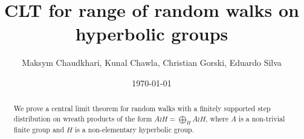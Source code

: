 \documentclass[reqno,oneside,11pt]{amsart}
\title{CLT for range of random walks on hyperbolic groups}
\author{Maksym Chaudkhari, Kunal Chawla, Christian Gorski, Eduardo Silva }
\date{\today}
\begin{document}
	\begin{abstract} 
We prove a central limit theorem for random walks with a finitely supported step distribution on wreath products of the form $A\wr H=\bigoplus_H A\wr H $, where $A$ is a non-trivial finite group and $H$ is a non-elementary hyperbolic group.
	\end{abstract}
\maketitle



%
%

%



\end{document}
